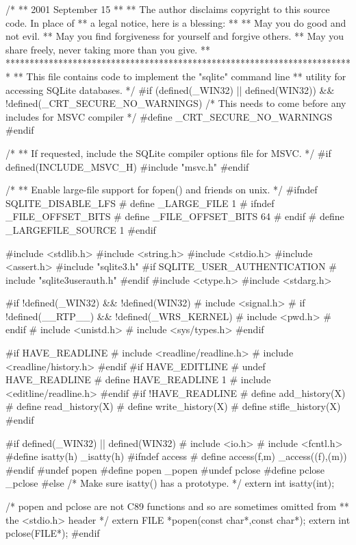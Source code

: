 \begin{Codex}[label=shell.c,numbers=left]
/*
** 2001 September 15
**
** The author disclaims copyright to this source code.  In place of
** a legal notice, here is a blessing:
**
**    May you do good and not evil.
**    May you find forgiveness for yourself and forgive others.
**    May you share freely, never taking more than you give.
**
*************************************************************************
** This file contains code to implement the "sqlite" command line
** utility for accessing SQLite databases.
*/
#if (defined(_WIN32) || defined(WIN32)) && !defined(_CRT_SECURE_NO_WARNINGS)
/* This needs to come before any includes for MSVC compiler */
#define _CRT_SECURE_NO_WARNINGS
#endif

/*
** If requested, include the SQLite compiler options file for MSVC.
*/
#if defined(INCLUDE_MSVC_H)
#include "msvc.h"
#endif

/*
** Enable large-file support for fopen() and friends on unix.
*/
#ifndef SQLITE_DISABLE_LFS
# define _LARGE_FILE       1
# ifndef _FILE_OFFSET_BITS
#   define _FILE_OFFSET_BITS 64
# endif
# define _LARGEFILE_SOURCE 1
#endif

#include <stdlib.h>
#include <string.h>
#include <stdio.h>
#include <assert.h>
#include "sqlite3.h"
#if SQLITE_USER_AUTHENTICATION
# include "sqlite3userauth.h"
#endif
#include <ctype.h>
#include <stdarg.h>

#if !defined(_WIN32) && !defined(WIN32)
# include <signal.h>
# if !defined(__RTP__) && !defined(_WRS_KERNEL)
#  include <pwd.h>
# endif
# include <unistd.h>
# include <sys/types.h>
#endif

#if HAVE_READLINE
# include <readline/readline.h>
# include <readline/history.h>
#endif
#if HAVE_EDITLINE
# undef HAVE_READLINE
# define HAVE_READLINE 1
# include <editline/readline.h>
#endif
#if !HAVE_READLINE
# define add_history(X)
# define read_history(X)
# define write_history(X)
# define stifle_history(X)
#endif

#if defined(_WIN32) || defined(WIN32)
# include <io.h>
# include <fcntl.h>
#define isatty(h) _isatty(h)
#ifndef access
# define access(f,m) _access((f),(m))
#endif
#undef popen
#define popen _popen
#undef pclose
#define pclose _pclose
#else
/* Make sure isatty() has a prototype.
*/
extern int isatty(int);

/* popen and pclose are not C89 functions and so are sometimes omitted from
** the <stdio.h> header */
extern FILE *popen(const char*,const char*);
extern int pclose(FILE*);
#endif


\end{Codex}
